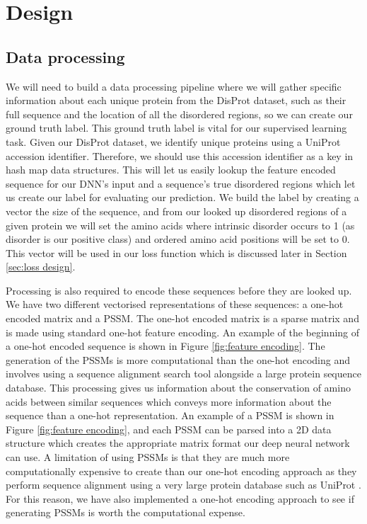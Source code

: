 \documentclass{l4proj}
\begin{document}
\chapter{Design}
\label{chap:design}

\section{Data processing}

We will need to build a data processing pipeline where we will gather specific information about each unique protein from the DisProt dataset, such as their full sequence and the location of all the disordered regions, so we can create our ground truth label. This ground truth label is vital for our supervised learning task. Given our DisProt dataset, we identify unique proteins using a UniProt accession identifier. Therefore, we should use this accession identifier as a key in hash map data structures. This will let us easily lookup the feature encoded sequence for our DNN's input and a sequence’s true disordered regions which let us create our label for evaluating our prediction. We build the label by creating a vector the size of the sequence, and from our looked up disordered regions of a given protein we will set the amino acids where intrinsic disorder occurs to 1 (as disorder is our positive class) and ordered amino acid positions will be set to 0. This vector will be used in our loss function which is discussed later in Section \ref{sec:loss design}. 

Processing is also required to encode these sequences before they are looked up. We have two different vectorised representations of these sequences: a one-hot encoded matrix and a PSSM. The one-hot encoded matrix is a sparse matrix and is made using standard one-hot feature encoding. An example of the beginning of a one-hot encoded sequence is shown in Figure \ref{fig:feature encoding}. The generation of the PSSMs is more computational than the one-hot encoding and involves using a sequence alignment search tool alongside a large protein sequence database. This processing gives us information about the conservation of amino acids between similar sequences which conveys more information about the sequence than a one-hot representation. An example of a PSSM is shown in Figure \ref{fig:feature encoding}, and each PSSM can be parsed into a 2D data structure which creates the appropriate matrix format our deep neural network can use. A limitation of using PSSMs is that they are much more computationally expensive to create than our one-hot encoding approach as they perform sequence alignment using a very large protein database such as UniProt \citep{uniprot:22}. For this reason, we have also implemented a one-hot encoding approach to see if generating PSSMs is worth the computational expense. 
\end{document}
